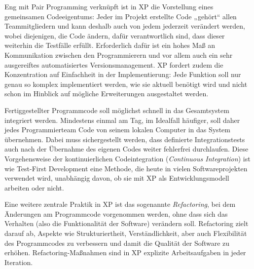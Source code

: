 Eng mit Pair Programming verknüpft ist in XP die Vorstellung eines 
gemeinsamen Codeeigentums: Jeder im Projekt erstellte Code „gehört“ allen Teammitgliedern und kann deshalb auch von jedem jederzeit verändert werden, wobei diejenigen, die Code ändern, dafür verantwortlich sind, dass dieser weiterhin die Testfälle erfüllt. Erforderlich dafür ist ein hohes Maß an Kommunikation zwischen den Programmierern und vor allem auch ein sehr ausgereiftes automatisiertes Versionsmanagement.
XP fordert zudem die Konzentration auf Einfachheit in der Implementierung: Jede Funktion soll nur genau so komplex implementiert werden, wie sie aktuell benötigt wird und nicht schon im Hinblick auf mögliche Erweiterungen ausgestaltet werden.


Fertiggestellter Programmcode soll möglichst schnell in das Gesamtsystem integriert werden. Mindestens einmal am Tag, im Idealfall häufiger, soll daher jedes Programmierteam Code von seinem lokalen Computer in das System übernehmen. Dabei muss sichergestellt werden, dass definierte Integrationstests auch nach der Übernahme des eigenen Codes weiter fehlerfrei durchlaufen. Diese Vorgehensweise der kontinuierlichen Code\-inte\-gra\-tion (\textit{Continuous Integration}) 
ist wie Test-First Devel\-op\-ment eine Methode, die heute in vielen Softwareprojekten verwendet wird, unabhängig davon, ob sie mit XP als Entwicklungsmodell arbeiten oder nicht. 

Eine weitere zentrale Praktik in XP ist das sogenannte \textit{Refactoring}, 
bei dem Änderungen am Programmcode vorgenommen werden, ohne dass sich das Verhalten (also die Funktionalität der Software) verändern soll. Refactoring zielt darauf ab, Aspekte wie Strukturiertheit, Verständlichkeit, aber auch Flexibilität des Programmcodes zu verbessern und damit die Qualität der Software zu erhöhen. Refactoring-Maßnahmen sind in XP explizite Arbeitsaufgaben in jeder Iteration. 


